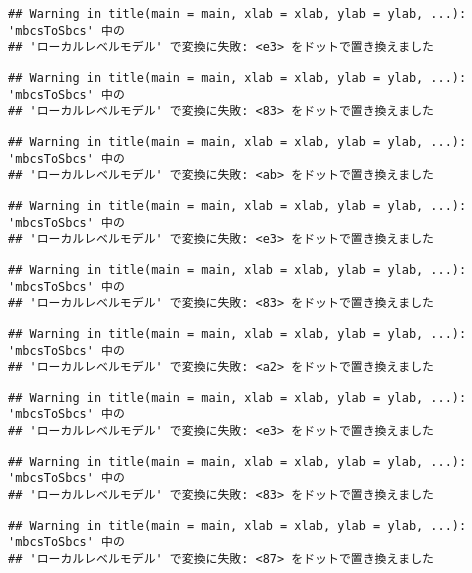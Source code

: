 \documentclass[]{article}
\begin{document}
\begin{verbatim}
## Warning in title(main = main, xlab = xlab, ylab = ylab, ...): 'mbcsToSbcs' 中の
## 'ローカルレベルモデル' で変換に失敗: <e3> をドットで置き換えました
\end{verbatim}

\begin{verbatim}
## Warning in title(main = main, xlab = xlab, ylab = ylab, ...): 'mbcsToSbcs' 中の
## 'ローカルレベルモデル' で変換に失敗: <83> をドットで置き換えました
\end{verbatim}

\begin{verbatim}
## Warning in title(main = main, xlab = xlab, ylab = ylab, ...): 'mbcsToSbcs' 中の
## 'ローカルレベルモデル' で変換に失敗: <ab> をドットで置き換えました
\end{verbatim}

\begin{verbatim}
## Warning in title(main = main, xlab = xlab, ylab = ylab, ...): 'mbcsToSbcs' 中の
## 'ローカルレベルモデル' で変換に失敗: <e3> をドットで置き換えました
\end{verbatim}

\begin{verbatim}
## Warning in title(main = main, xlab = xlab, ylab = ylab, ...): 'mbcsToSbcs' 中の
## 'ローカルレベルモデル' で変換に失敗: <83> をドットで置き換えました
\end{verbatim}

\begin{verbatim}
## Warning in title(main = main, xlab = xlab, ylab = ylab, ...): 'mbcsToSbcs' 中の
## 'ローカルレベルモデル' で変換に失敗: <a2> をドットで置き換えました
\end{verbatim}

\begin{verbatim}
## Warning in title(main = main, xlab = xlab, ylab = ylab, ...): 'mbcsToSbcs' 中の
## 'ローカルレベルモデル' で変換に失敗: <e3> をドットで置き換えました
\end{verbatim}

\begin{verbatim}
## Warning in title(main = main, xlab = xlab, ylab = ylab, ...): 'mbcsToSbcs' 中の
## 'ローカルレベルモデル' で変換に失敗: <83> をドットで置き換えました
\end{verbatim}

\begin{verbatim}
## Warning in title(main = main, xlab = xlab, ylab = ylab, ...): 'mbcsToSbcs' 中の
## 'ローカルレベルモデル' で変換に失敗: <87> をドットで置き換えました
\end{verbatim}
\end{document}
